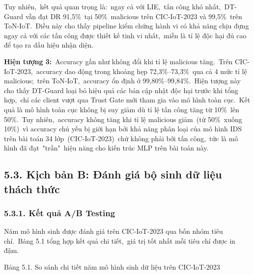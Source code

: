 Tuy nhiên,~kết quả quan trọng là:~ngay cả với LIE,~tấn công khó nhất,~DT-Guard vẫn đạt DR 91,5\%~tại 50\%~malicious trên CIC-IoT-2023 và 99,5\%~trên ToN-IoT.~Điều này cho thấy pipeline kiểm chứng hành vi có khả năng chịu đựng ngay cả với các tấn công được thiết kế tinh vi nhất,~miễn là tỉ lệ độc hại đủ cao để tạo ra dấu hiệu nhận diện.

\textbf{Hiện tượng 3:}~Accuracy gần như không đổi khi tỉ lệ malicious tăng.~Trên CIC-IoT-2023,~accuracy dao động trong khoảng hẹp 72,3\%--73,3\%~qua cả 4 mức tỉ lệ malicious;~trên ToN-IoT,~accuracy ổn định ở 99,80\%--99,84\%.~Hiện tượng này cho thấy DT-Guard loại bỏ hiệu quả các bản cập nhật độc hại trước khi tổng hợp,~chỉ các client vượt qua Trust Gate mới tham gia vào mô hình toàn cục.~Kết quả là mô hình toàn cục không bị suy giảm dù tỉ lệ tấn công tăng từ 10\%~lên 50\%.~Tuy nhiên,~accuracy không tăng khi tỉ lệ malicious giảm~(từ 50\%~xuống 10\%)~vì accuracy chủ yếu bị giới hạn bởi khả năng phân loại của mô hình IDS trên bài toán 34 lớp~(CIC-IoT-2023)~chứ không phải bởi tấn công,~tức là mô hình đã đạt~"trần"~hiệu năng cho kiến trúc MLP trên bài toán này.

\subsection{5.3. Kịch bản B: Đánh giá bộ sinh dữ liệu thách thức}\label{kux1ecbch-bux1ea3n-b-ux111uxe1nh-giuxe1-bux1ed9-sinh-dux1eef-liux1ec7u-thuxe1ch-thux1ee9c}

\subsubsection{5.3.1. Kết quả A/B Testing}\label{kux1ebft-quux1ea3-ab-testing}

Năm mô hình sinh được đánh giá trên CIC-IoT-2023 qua bốn nhóm tiêu chí.~Bảng 5.1 tổng hợp kết quả chi tiết,~giá trị tốt nhất mỗi tiêu chí được in đậm.

\protect{}\label{_Toc228034267}{}Bảng 5.1. So sánh chi tiết năm mô hình sinh dữ liệu trên CIC-IoT-2023

